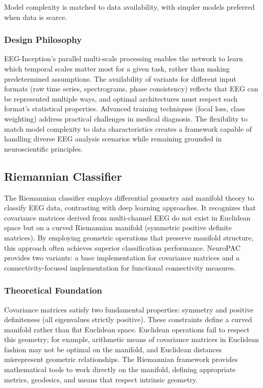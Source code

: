 \documentclass[12pt]{report}
\begin{document}
Model complexity is matched to data availability, with simpler models preferred when data is scarce.

\subsubsection{Design Philosophy}

EEG-Inception's parallel multi-scale processing enables the network to learn which temporal scales matter most for a given task, rather than making predetermined assumptions. The availability of variants for different input formats (raw time series, spectrograms, phase consistency) reflects that EEG can be represented multiple ways, and optimal architectures must respect each format's statistical properties. Advanced training techniques (focal loss, class weighting) address practical challenges in medical diagnosis. The flexibility to match model complexity to data characteristics creates a framework capable of handling diverse EEG analysis scenarios while remaining grounded in neuroscientific principles.

\subsection{Riemannian Classifier}

The Riemannian classifier employs differential geometry and manifold theory to classify EEG data, contrasting with deep learning approaches. It recognizes that covariance matrices derived from multi-channel EEG do not exist in Euclidean space but on a curved Riemannian manifold (symmetric positive definite matrices). By employing geometric operations that preserve manifold structure, this approach often achieves superior classification performance. NeuroPAC provides two variants: a base implementation for covariance matrices and a connectivity-focused implementation for functional connectivity measures.

\subsubsection{Theoretical Foundation}

Covariance matrices satisfy two fundamental properties: symmetry and positive definiteness (all eigenvalues strictly positive). These constraints define a curved manifold rather than flat Euclidean space. Euclidean operations fail to respect this geometry; for example, arithmetic means of covariance matrices in Euclidean fashion may not be optimal on the manifold, and Euclidean distances misrepresent geometric relationships. The Riemannian framework provides mathematical tools to work directly on the manifold, defining appropriate metrics, geodesics, and means that respect intrinsic geometry.
\end{document}
